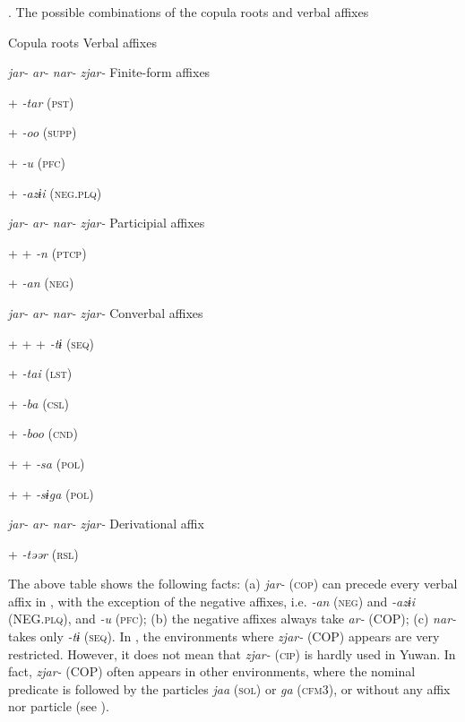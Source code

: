 \begin{styleBeschriftung}
\textmd{}\textmd{. The possible combinations of the copula roots and verbal affixes}
\end{styleBeschriftung}

Copula roots  Verbal affixes

\textit{jar-}  \textit{ar-}  \textit{nar-}  \textit{zjar-}  Finite-form affixes

+        \textit{{}-tar} (\textsc{pst})

+        \textit{{}-oo} (\textsc{supp})

  +      \textit{{}-u} (\textsc{pfc})

  +      \textit{{}-azɨi} (\textsc{neg}.\textsc{plq})

\textit{jar-}  \textit{ar-}  \textit{nar-}  \textit{zjar-}  Participial affixes

+      +  \textit{{}-n} (\textsc{ptcp})

  +      \textit{{}-an} (\textsc{neg})

\textit{jar-}  \textit{ar-}  \textit{nar-}  \textit{zjar-}  Converbal affixes

+  +  +    \textit{{}-tɨ} (\textsc{seq})

+        \textit{{}-tai} (\textsc{lst})

+        \textit{{}-ba} (\textsc{csl})

+        \textit{{}-boo} (\textsc{cnd})

+      +  \textit{{}-sa} (\textsc{pol})

+      +  \textit{{}-sɨga} (\textsc{pol})

\textit{jar-}  \textit{ar-}  \textit{nar-}  \textit{zjar-}  Derivational affix

+        \textit{{}-təər} (\textsc{rsl})

The above table shows the following facts: (a) \textit{jar-} (\textsc{cop}) can precede every verbal affix in , with the exception of the negative affixes, i.e. \textit{-an} (\textsc{neg}) and \textit{{}-azɨi} (NEG.\textsc{plq}), and \textit{{}-u} (\textsc{pfc}); (b) the negative affixes always take \textit{ar-} (COP); (c) \textit{nar-} takes only \textit{{}-tɨ} (\textsc{seq}). In , the environments where \textit{zjar-} (COP) appears are very restricted. However, it does not mean that \textit{zjar-} (\textsc{cip}) is hardly used in Yuwan. In fact, \textit{zjar-} (COP) often appears in other environments, where the nominal predicate is followed by the particles \textit{jaa} (\textsc{sol}) or \textit{ga} (\textsc{cfm}3), or without any affix nor particle (see ).

